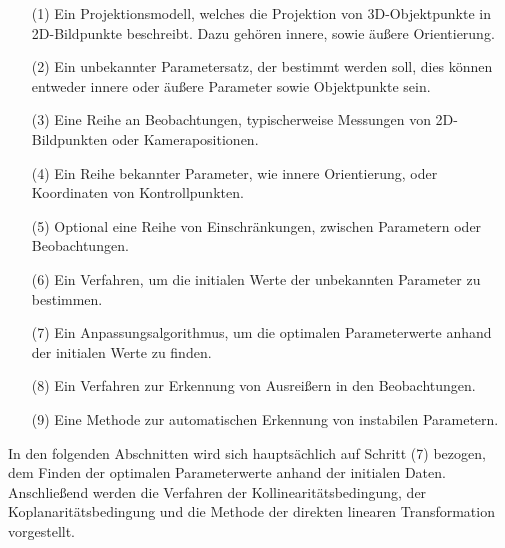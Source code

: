 \begin{itemize}
\item[(1)] Ein Projektionsmodell, welches die Projektion von 3D-Objektpunkte in 2D-Bildpunkte beschreibt. Dazu gehören innere, sowie äußere Orientierung.

\item[(2)] Ein unbekannter Parametersatz, der bestimmt werden soll, dies können entweder innere oder äußere Parameter sowie Objektpunkte sein.

\item[(3)] Eine Reihe an Beobachtungen, typischerweise Messungen von 2D-Bildpunkten oder Kamerapositionen.

\item[(4)] Ein Reihe bekannter Parameter, wie innere Orientierung, oder Koordinaten von Kontrollpunkten.

\item[(5)] Optional eine Reihe von Einschränkungen, zwischen Parametern oder Beobachtungen.

\item[(6)] Ein Verfahren, um die initialen Werte der unbekannten Parameter zu bestimmen.

\item[(7)] Ein Anpassungsalgorithmus, um die optimalen Parameterwerte anhand der initialen Werte zu finden.

\item[(8)] Ein Verfahren zur Erkennung von Ausreißern in den Beobachtungen.

\item[(9)] Eine Methode zur automatischen Erkennung von instabilen Parametern.

\end{itemize}

In den folgenden Abschnitten wird sich hauptsächlich auf Schritt (7) bezogen, dem Finden der optimalen Parameterwerte anhand der initialen Daten. Anschließend werden die Verfahren der Kollinearitätsbedingung, der Koplanaritätsbedingung und die Methode der direkten linearen Transformation vorgestellt. 

